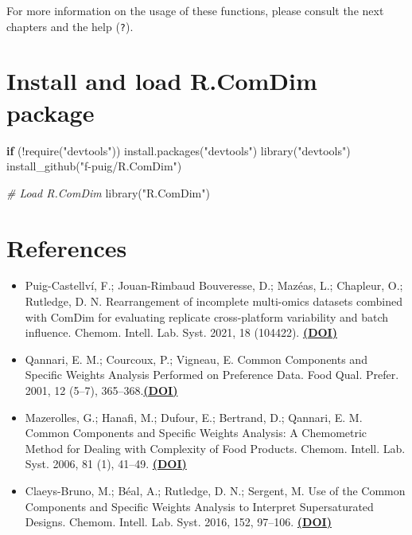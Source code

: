 \documentclass[
]{book}
\newenvironment{Shaded}{\begin{snugshade}}{\end{snugshade}}
\newcommand{\CommentTok}[1]{\textcolor[rgb]{0.56,0.35,0.01}{\textit{#1}}}
\newcommand{\ControlFlowTok}[1]{\textcolor[rgb]{0.13,0.29,0.53}{\textbf{#1}}}
\newcommand{\FunctionTok}[1]{\textcolor[rgb]{0.00,0.00,0.00}{#1}}
\newcommand{\NormalTok}[1]{#1}
\newcommand{\SpecialCharTok}[1]{\textcolor[rgb]{0.00,0.00,0.00}{#1}}
\newcommand{\StringTok}[1]{\textcolor[rgb]{0.31,0.60,0.02}{#1}}
\providecommand{\tightlist}{%
  \setlength{\itemsep}{0pt}\setlength{\parskip}{0pt}}
\begin{document}
For more information on the usage of these functions, please consult the
next chapters and the help (\texttt{?}).

\hypertarget{install}{%
\section{Install and load R.ComDim package}\label{install}}

\begin{Shaded}
\begin{Highlighting}[]
  \ControlFlowTok{if}\NormalTok{ (}\SpecialCharTok{!}\FunctionTok{require}\NormalTok{(}\StringTok{"devtools"}\NormalTok{)) }\FunctionTok{install.packages}\NormalTok{(}\StringTok{"devtools"}\NormalTok{)}
  \FunctionTok{library}\NormalTok{(}\StringTok{"devtools"}\NormalTok{)}
  \FunctionTok{install\_github}\NormalTok{(}\StringTok{"f{-}puig/R.ComDim"}\NormalTok{)}
  
  \CommentTok{\# Load R.ComDim}
  \FunctionTok{library}\NormalTok{(}\StringTok{"R.ComDim"}\NormalTok{)}
\end{Highlighting}
\end{Shaded}

\hypertarget{references}{%
\section{References}\label{references}}

\begin{itemize}
\tightlist
\item
  Puig-Castellví, F.; Jouan-Rimbaud Bouveresse, D.; Mazéas, L.; Chapleur, O.;
  Rutledge, D. N. Rearrangement of incomplete multi-omics datasets combined with
  ComDim for evaluating replicate cross-platform variability and batch influence.
  Chemom. Intell. Lab. Syst. 2021, 18 (104422). \href{https://doi.org/10.1016/j.chemolab.2021.104422}{\textbf{(DOI)}}
\item
  Qannari, E. M.; Courcoux, P.; Vigneau, E. Common Components and Specific
  Weights Analysis Performed on Preference Data. Food Qual. Prefer. 2001, 12
  (5--7), 365--368.\href{https://doi.org/10.1016/S0950-3293(01)00026-X}{\textbf{(DOI)}}
\item
  Mazerolles, G.; Hanafi, M.; Dufour, E.; Bertrand, D.; Qannari, E. M. Common
  Components and Specific Weights Analysis: A Chemometric Method for Dealing with
  Complexity of Food Products. Chemom. Intell. Lab. Syst. 2006, 81 (1), 41--49. \href{https://doi.org/10.1016/J.CHEMOLAB.2005.09.004}{\textbf{(DOI)}}
\item
  Claeys-Bruno, M.; Béal, A.; Rutledge, D. N.; Sergent, M. Use of the Common
  Components and Specific Weights Analysis to Interpret Supersaturated Designs.
  Chemom. Intell. Lab. Syst. 2016, 152, 97--106.
  \href{https://doi.org/10.1016/j.chemolab.2016.01.014}{\textbf{(DOI)}}
\end{itemize}
\end{document}
